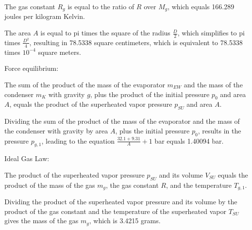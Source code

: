 The gas constant \( R_g \) is equal to the ratio of \( R \) over \( M_g \), which equals 166.289 joules per kilogram Kelvin.

The area \( A \) is equal to pi times the square of the radius \( \frac{D}{2} \), which simplifies to pi times \( \frac{D^2}{4} \), resulting in 78.5338 square centimeters, which is equivalent to 78.5338 times \( 10^{-4} \) square meters.

Force equilibrium:

The sum of the product of the mass of the evaporator \( m_{EW} \) and the mass of the condenser \( m_K \) with gravity \( g \), plus the product of the initial pressure \( p_0 \) and area \( A \), equals the product of the superheated vapor pressure \( p_{SU} \) and area \( A \).

Dividing the sum of the product of the mass of the evaporator and the mass of the condenser with gravity by area \( A \), plus the initial pressure \( p_0 \), results in the pressure \( p_{g,1} \), leading to the equation \( \frac{32.1 + 9.31}{A} + 1 \) bar equals 1.40094 bar.

Ideal Gas Law:

The product of the superheated vapor pressure \( p_{SU} \) and its volume \( V_{SU} \) equals the product of the mass of the gas \( m_g \), the gas constant \( R \), and the temperature \( T_{g,1} \).

Dividing the product of the superheated vapor pressure and its volume by the product of the gas constant and the temperature of the superheated vapor \( T_{SU} \) gives the mass of the gas \( m_g \), which is 3.4215 grams.